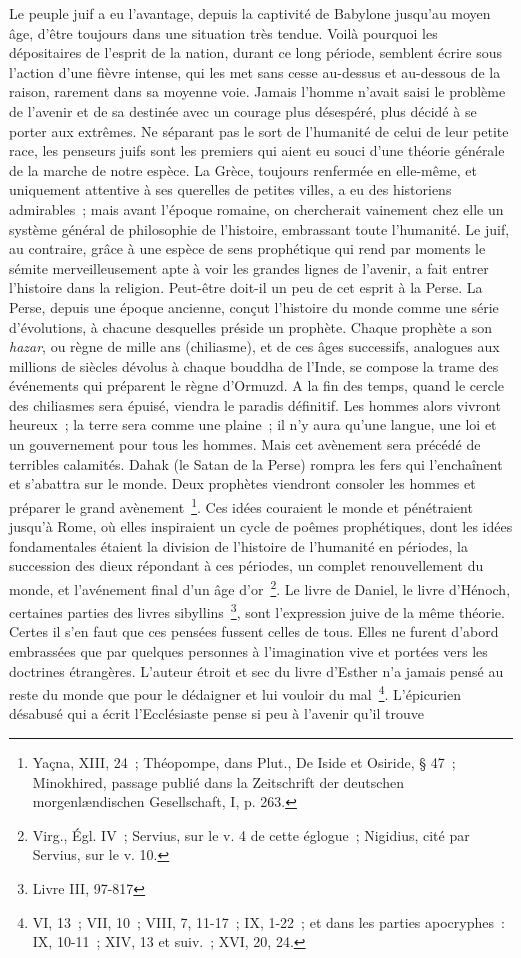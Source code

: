 \documentclass[french,twoside]{book} %
\begin{document}
Le peuple juif a eu l’avantage, depuis la captivité de Babylone jusqu’au moyen âge, d’être toujours dans une situation très tendue. Voilà pourquoi les dépositaires de l’esprit de la nation, durant ce long période, semblent écrire sous l’action d’une fièvre intense, qui les met sans cesse au-dessus et au-dessous de la raison, rarement dans sa moyenne voie. Jamais l’homme n’avait saisi le problème de l’avenir et de sa destinée avec un courage plus désespéré, plus décidé à se porter aux extrêmes. Ne séparant pas le sort de l’humanité de celui de leur petite race, les penseurs juifs sont les premiers qui aient eu souci d’une théorie générale de la marche de notre espèce. La Grèce, toujours renfermée en elle-même, et uniquement attentive à ses querelles de petites villes, a eu des historiens admirables ; mais avant l’époque romaine, on chercherait vainement chez elle un système général de philosophie de l’histoire, embrassant toute l’humanité. Le juif, au contraire, grâce à une espèce de sens prophétique qui rend par moments le sémite merveilleusement apte à voir les grandes lignes de l’avenir, a fait entrer l’histoire dans la religion. Peut-être doit-il un peu de cet esprit à la Perse. La Perse, depuis une époque ancienne, conçut l’histoire du monde comme une série d’évolutions, à chacune desquelles préside un prophète. Chaque prophète a son {\itshape hazar}, ou règne de mille ans (chiliasme), et de ces âges successifs, analogues aux millions de siècles dévolus à chaque bouddha de l’Inde, se compose la trame des événements qui préparent le règne d’Ormuzd. A la fin des temps, quand le cercle des chiliasmes sera épuisé, viendra le paradis définitif. Les hommes alors vivront heureux ; la terre sera comme une plaine ; il n’y aura qu’une langue, une loi et un gouvernement pour tous les hommes. Mais cet avènement sera précédé de terribles calamités. Dahak (le Satan de la Perse) rompra les fers qui l’enchaînent et s’abattra sur le monde. Deux prophètes viendront consoler les hommes et préparer le grand avènement \footnote{ Yaçna, XIII, 24 ; Théopompe, dans Plut., De Iside et Osiride, § 47 ; Minokhired, passage publié dans la Zeitschrift der deutschen morgenlændischen Gesellschaft, I, p. 263.}. Ces idées couraient le monde et pénétraient jusqu’à Rome, où elles inspiraient un cycle de poêmes prophétiques, dont les idées fondamentales étaient la division de l’histoire de l’humanité en périodes, la succession des dieux répondant à ces périodes, un complet renouvellement du monde, et l’avénement final d’un âge d’or \footnote{Virg., Égl. IV ; Servius, sur le v. 4 de cette églogue ; Nigidius, cité par Servius, sur le v. 10.}. Le livre de Daniel, le livre d’Hénoch, certaines parties des livres sibyllins \footnote{Livre III, 97-817}, sont l’expression juive de la même théorie. Certes il s’en faut que ces pensées fussent celles de tous. Elles ne furent d’abord embrassées que par quelques personnes à l’imagination vive et portées vers les doctrines étrangères. L’auteur étroit et sec du livre d’Esther n’a jamais pensé au reste du monde que pour le dédaigner et lui vouloir du mal \footnote{VI, 13 ; VII, 10 ; VIII, 7, 11-17 ; IX, 1-22 ; et dans les parties apocryphes : IX, 10-11 ; XIV, 13 et suiv. ; XVI, 20, 24.}. L’épicurien désabusé qui a écrit l’Ecclésiaste pense si peu à l’avenir qu’il trouve 
\end{document}
